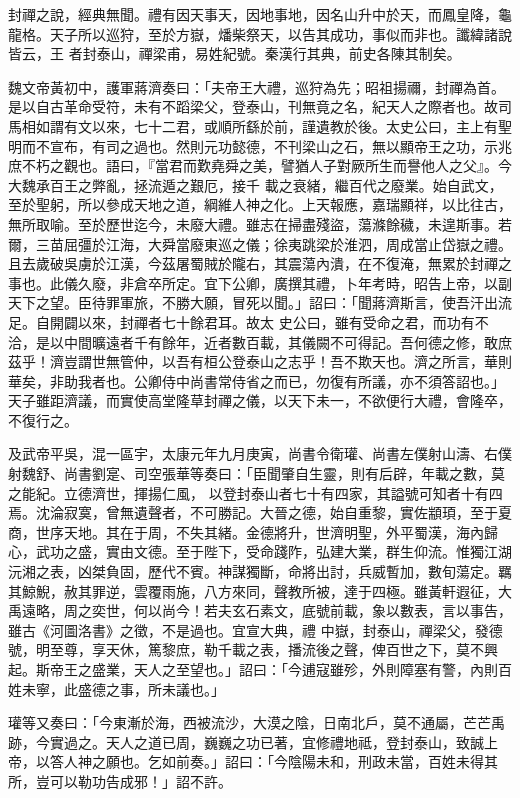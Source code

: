 \begin{pinyinscope}
 封禪之說，經典無聞。禮有因天事天，因地事地，因名山升中於天，而鳳皇降，龜龍格。天子所以巡狩，至於方嶽，燔柴祭天，以告其成功，事似而非也。讖緯諸說皆云，王
 者封泰山，禪梁甫，易姓紀號。秦漢行其典，前史各陳其制矣。



 魏文帝黃初中，護軍蔣濟奏曰：「夫帝王大禮，巡狩為先；昭祖揚禰，封禪為首。是以自古革命受符，未有不蹈梁父，登泰山，刊無竟之名，紀天人之際者也。故司馬相如謂有文以來，七十二君，或順所繇於前，謹遺教於後。太史公曰，主上有聖明而不宣布，有司之過也。然則元功懿德，不刊梁山之石，無以顯帝王之功，示兆庶不朽之觀也。語曰，『當君而歎堯舜之美，譬猶人子對厥所生而譽他人之父』。今大魏承百王之弊亂，拯流遁之艱厄，接千
 載之衰緒，繼百代之廢業。始自武文，至於聖躬，所以參成天地之道，綱維人神之化。上天報應，嘉瑞顯祥，以比往古，無所取喻。至於歷世迄今，未廢大禮。雖志在掃盡殘盜，蕩滌餘穢，未遑斯事。若爾，三苗屈彊於江海，大舜當廢東巡之儀；徐夷跳梁於淮泗，周成當止岱嶽之禮。且去歲破吳虜於江漢，今茲屠蜀賊於隴右，其震蕩內潰，在不復淹，無累於封禪之事也。此儀久廢，非倉卒所定。宜下公卿，廣撰其禮，卜年考時，昭告上帝，以副天下之望。臣待罪軍旅，不勝大願，冒死以聞。」詔曰：「聞蔣濟斯言，使吾汗出流足。自開闢以來，封禪者七十餘君耳。故太
 史公曰，雖有受命之君，而功有不洽，是以中間曠遠者千有餘年，近者數百載，其儀闕不可得記。吾何德之修，敢庶茲乎！濟豈謂世無管仲，以吾有桓公登泰山之志乎！吾不欺天也。濟之所言，華則華矣，非助我者也。公卿侍中尚書常侍省之而已，勿復有所議，亦不須答詔也。」天子雖距濟議，而實使高堂隆草封禪之儀，以天下未一，不欲便行大禮，會隆卒，不復行之。



 及武帝平吳，混一區宇，太康元年九月庚寅，尚書令衛瓘、尚書左僕射山濤、右僕射魏舒、尚書劉寔、司空張華等奏曰：「臣聞肇自生靈，則有后辟，年載之數，莫之能紀。立德濟世，揮揚仁風，
 以登封泰山者七十有四家，其謚號可知者十有四焉。沈淪寂寞，曾無遺聲者，不可勝記。大晉之德，始自重黎，實佐顓頊，至于夏商，世序天地。其在于周，不失其緒。金德將升，世濟明聖，外平蜀漢，海內歸心，武功之盛，實由文德。至于陛下，受命踐阼，弘建大業，群生仰流。惟獨江湖沅湘之表，凶桀負固，歷代不賓。神謀獨斷，命將出討，兵威暫加，數旬蕩定。羈其鯨鯢，赦其罪逆，雲覆雨施，八方來同，聲教所被，達于四極。雖黃軒遐征，大禹遠略，周之奕世，何以尚今！若夫玄石素文，底號前載，象以數表，言以事告，雖古《河圖洛書》之徵，不是過也。宜宣大典，禮
 中嶽，封泰山，禪梁父，發德號，明至尊，享天休，篤黎庶，勒千載之表，播流後之聲，俾百世之下，莫不興起。斯帝王之盛業，天人之至望也。」詔曰：「今逋寇雖殄，外則障塞有警，內則百姓未寧，此盛德之事，所未議也。」



 瓘等又奏曰：「今東漸於海，西被流沙，大漠之陰，日南北戶，莫不通屬，芒芒禹跡，今實過之。天人之道已周，巍巍之功已著，宜修禮地祗，登封泰山，致誠上帝，以答人神之願也。乞如前奏。」詔曰：「今陰陽未和，刑政未當，百姓未得其所，豈可以勒功告成邪！」詔不許。




\end{pinyinscope}
